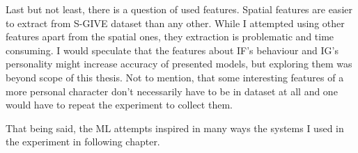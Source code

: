 Last but not least, there is a question of used features. Spatial features are easier to extract from S-GIVE dataset than any other. While I attempted using other features apart from the spatial ones, they extraction is problematic and time consuming. I would speculate that the features about IF's behaviour and IG's personality might increase accuracy of presented models, but exploring them was beyond scope of this thesis. Not to mention, that some interesting features of a more personal character don't necessarily have to be in dataset at all and one would have to repeat the experiment to collect them.

That being said, the ML attempts inspired in many ways the systems I used in the experiment in following chapter. 




